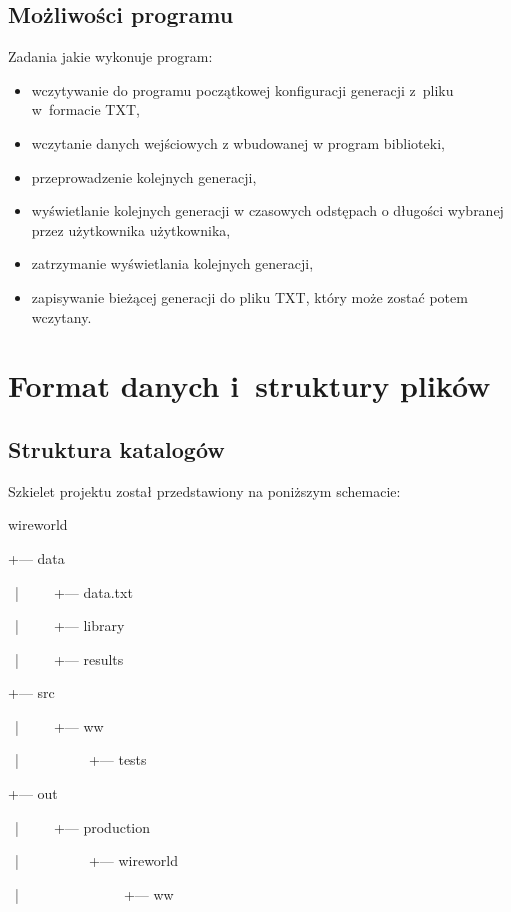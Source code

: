 \documentclass[a4paper,12pt,oneside]{article}
\begin{document}
\subsection{Możliwości programu}

Zadania jakie wykonuje program:
\begin{itemize}
\item  wczytywanie do programu początkowej konfiguracji generacji z~pliku w~formacie TXT,
\item  wczytanie danych wejściowych z wbudowanej w program biblioteki,
\item  przeprowadzenie kolejnych generacji,
\item  wyświetlanie kolejnych generacji w czasowych odstępach o długości wybranej przez użytkownika użytkownika,
\item zatrzymanie wyświetlania kolejnych generacji,
\item  zapisywanie bieżącej generacji do pliku TXT, który może zostać potem wczytany.
\end{itemize}


\section{Format danych i~struktury plików}


\subsection{Struktura katalogów}

Szkielet projektu został przedstawiony na poniższym schemacie: \newline

\par wireworld
\par +--- data
\par \ |\ \ \ \ \  +--- data.txt
\par \ |\ \ \ \ \  +--- library
\par \ |\ \ \ \ \  +--- results
\par +--- src
\par \ |\ \ \ \ \  +--- ww
\par \ |\ \ \ \ \ \ \ \ \ \  +--- tests

\par +--- out
\par \ |\ \ \ \ \  +--- production
\par \ |\ \ \ \ \ \ \ \ \ \  +--- wireworld
\par \ |\ \ \ \ \ \ \ \ \ \ \ \ \ \ \  +--- ww
\newline
\end{document}
